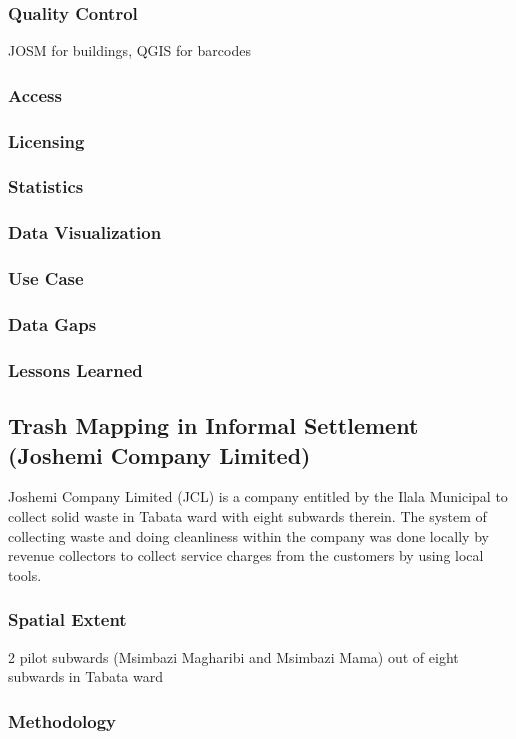 \documentclass[a4paper,12pt,twoside]{article}
\begin{document}
\subsubsection{Quality Control}
JOSM for buildings, QGIS for barcodes
\subsubsection{Access}
\subsubsection{Licensing}
\subsubsection{Statistics}
\subsubsection{Data Visualization}
\subsubsection{Use Case}
\subsubsection{Data Gaps}
\subsubsection{Lessons Learned}

\newpage
\subsection{Trash Mapping in Informal Settlement (Joshemi Company Limited)}

Joshemi Company Limited (JCL) is a company entitled by the Ilala Municipal to collect solid waste in Tabata ward with eight subwards therein. The system of collecting waste and doing cleanliness within the company was done locally by revenue collectors to collect service charges from the customers by using local tools.
\subsubsection {Spatial Extent}
2 pilot subwards (Msimbazi Magharibi and Msimbazi Mama) out of eight subwards in Tabata ward
\subsubsection{Methodology}
\end{document}
